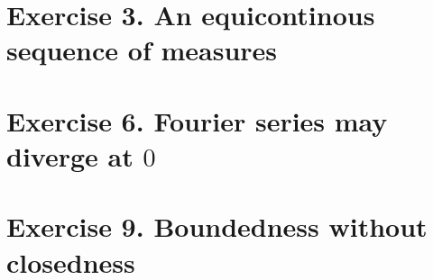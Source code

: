\section{Exercise 3. An equicontinous sequence of measures}

\section{Exercise 6. Fourier series may diverge at $0$}

\section{Exercise 9. Boundedness without closedness}

%
%